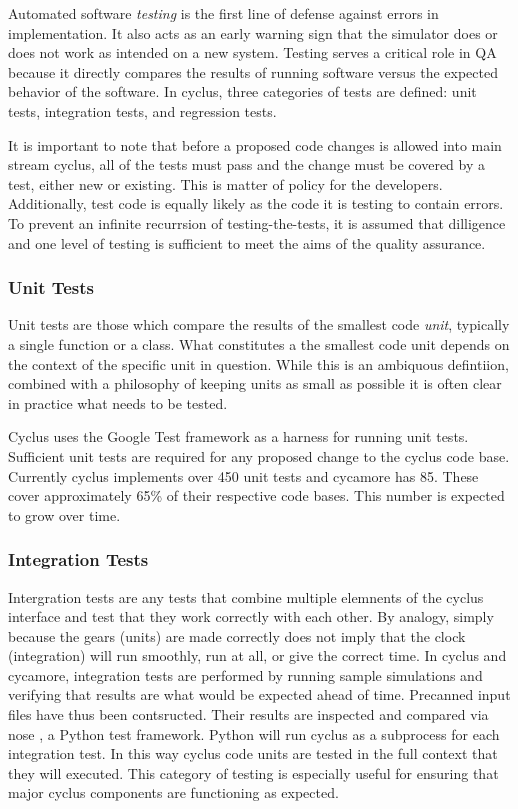 Automated software \emph{testing} is the first line of defense against
errors in implementation. It also acts as an early warning sign that the
simulator does or does not work as intended on a new system.
Testing serves a critical role in QA because it directly compares the 
results of running software versus the expected behavior of the software.
In cyclus, three categories of tests are defined: unit tests, integration 
tests, and regression tests. 

It is important to note that before a proposed
code changes is allowed into main stream cyclus, all of the tests must pass
and the change must be covered by a test, either new or existing. This is 
matter of policy for the developers. Additionally, test code is equally likely 
as the code it is testing to contain errors. To prevent an infinite recurrsion 
of testing-the-tests, it is assumed that dilligence and one level of testing 
is sufficient to meet the aims of the quality assurance.

\subsubsection{Unit Tests}

Unit tests are those which compare the results of the smallest code \emph{unit}, 
typically a single function or a class. What constitutes a the smallest code
unit depends on the context of the specific unit in question. While this is 
an ambiquous defintiion, combined with a philosophy of keeping units as small
as possible it is often clear in practice what needs to be tested.

Cyclus uses the Google Test framework \cite{gtest} as a harness for running unit 
tests. Sufficient unit tests are required for any proposed change to the cyclus
code base. Currently cyclus implements over 450 unit tests and cycamore has 
85.  These cover approximately 65\% of their respective code bases. This number 
is expected to grow over time. 

\subsubsection{Integration Tests} 

Intergration tests are any tests that combine multiple elemnents of the 
cyclus interface and test that they work correctly with each other.  By analogy, 
simply because the gears (units) are made correctly does not imply that the 
clock (integration) will run smoothly, run at all, or give the correct time.
In cyclus and cycamore, integration tests are performed by running sample
simulations and verifying that results are what would be expected ahead of 
time. Precanned input files have thus been contsructed. Their results 
are inspected and compared via nose \cite{nosetests}, a Python test framework.
Python will run cyclus as a subprocess for each integration test. In this
way cyclus code units are tested in the full context that they will
executed. This category of testing is especially useful for ensuring that 
major cyclus components are functioning as expected.

